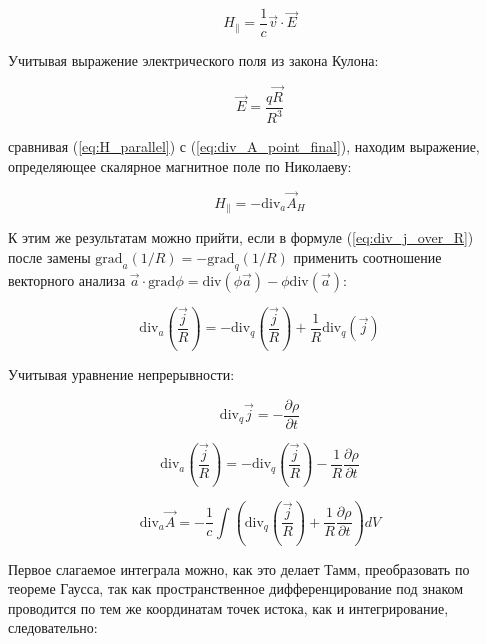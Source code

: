 \documentclass[12pt, a4paper]{article}
\begin{document}
\begin{equation}
H_{\parallel} = \frac{1}{c} \vec{v} \cdot \vec{E}
\label{eq:H_parallel}
\end{equation}

Учитывая выражение электрического поля из закона Кулона:

\begin{equation}
\vec{E} = \frac{q \vec{R}}{R^3}
\label{eq:E_coulomb}
\end{equation}

сравнивая (\ref{eq:H_parallel}) с (\ref{eq:div_A_point_final}), находим выражение, определяющее скалярное магнитное поле по Николаеву:

\begin{equation}
H_{\parallel} = -\text{div}_a \vec{A}_H
\label{eq:H_parallel_div}
\end{equation}

К этим же результатам можно прийти, если в формуле (\ref{eq:div_j_over_R}) после замены $\text{grad}_a(1/R) = -\text{grad}_q(1/R)$ применить соотношение векторного анализа $\vec{a} \cdot \text{grad} \phi = \text{div}(\phi \vec{a}) - \phi \text{div}(\vec{a})$:

\begin{equation}
\text{div}_a \left( \frac{\vec{j}}{R} \right) = -\text{div}_q \left( \frac{\vec{j}}{R} \right) + \frac{1}{R} \text{div}_q(\vec{j})
\label{eq:div_alternative}
\end{equation}

Учитывая уравнение непрерывности:

\begin{equation}
\text{div}_q \vec{j} = -\frac{\partial \rho}{\partial t}
\label{eq:continuity}
\end{equation}

\begin{equation}
\text{div}_a \left( \frac{\vec{j}}{R} \right) = -\text{div}_q \left( \frac{\vec{j}}{R} \right) - \frac{1}{R} \frac{\partial \rho}{\partial t}
\label{eq:div_with_continuity}
\end{equation}

\begin{equation}
\text{div}_a \vec{A} = -\frac{1}{c} \int \left( \text{div}_q \left( \frac{\vec{j}}{R} \right) + \frac{1}{R} \frac{\partial \rho}{\partial t} \right) dV
\label{eq:div_A_full}
\end{equation}

Первое слагаемое интеграла можно, как это делает Тамм, преобразовать по теореме Гаусса, так как пространственное дифференцирование под знаком проводится по тем же координатам точек истока, как и интегрирование, следовательно:
\end{document}
